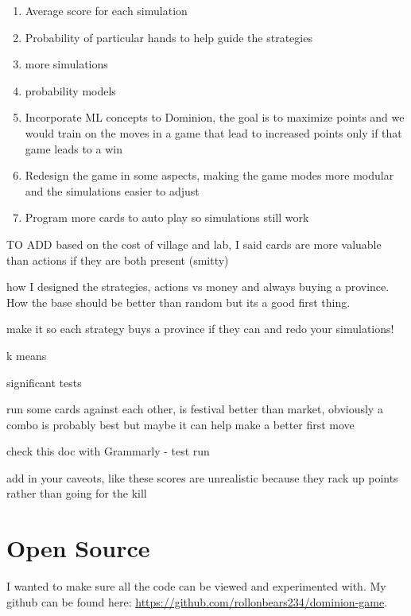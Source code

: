 \documentclass[11pt, oneside]{article}   	%
\begin{document}
	\begin{enumerate}
 		 \item Average score for each simulation
		 \item Probability of particular hands to help guide the strategies
		 \item more simulations
		 \item probability models
		 \item Incorporate ML concepts  to Dominion, the goal is to maximize points and we would train on the moves in a game that lead to increased points only if that game leads to a win
		 \item Redesign the game in some aspects, making the game modes more modular and the simulations easier to adjust
		 \item Program more cards to auto play so simulations still work
	\end{enumerate}
	

TO ADD
based on the cost of village and lab, I said cards are more valuable than actions if they are both present (smitty)

how I designed the strategies, actions vs money and always buying a province. How the base should be better than random but its a good first thing. 

make it so each strategy buys a province if they can and redo your simulations!

k means

significant tests

run some cards against each other, is festival better than market, obviously a combo is probably best but maybe it can help make a better first move

check this doc with Grammarly - test run

add in your caveots, like these scores are unrealistic because they rack up points rather than going for the kill


\section{Open Source}

I wanted to make sure all the code can be viewed and experimented with. My github can be found here: \url{https://github.com/rollonbears234/dominion-game}. 



\end{document}
